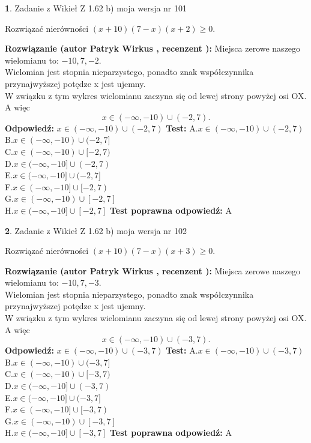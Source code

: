 \documentclass[12pt, a4paper]{article}
\theoremstyle{definition} %
\newtheorem{zad}{}
\newcommand{\zadStart}[1]{\begin{zad}#1\newline}
\newcommand{\zadStop}{\end{zad}}
\newcommand{\rozwStart}[2]{\noindent \textbf{Rozwiązanie (autor #1 , recenzent #2): }\newline}
\newcommand{\rozwStop}{\newline}
\newcommand{\odpStart}{\noindent \textbf{Odpowiedź:}\newline}
\newcommand{\odpStop}{\newline}
\newcommand{\testStart}{\noindent \textbf{Test:}\newline}
\newcommand{\testStop}{\newline}
\newcommand{\kluczStart}{\noindent \textbf{Test poprawna odpowiedź:}\newline}
\newcommand{\kluczStop}{\newline}
\begin{document}
\zadStart{Zadanie z Wikieł Z 1.62 b) moja wersja nr 101}

Rozwiązać nierówności $(x+10)(7-x)(x+2)\ge0$.
\zadStop
\rozwStart{Patryk Wirkus}{}
Miejsca zerowe naszego wielomianu to: $-10, 7, -2$.\\
Wielomian jest stopnia nieparzystego, ponadto znak współczynnika przy\linebreak najwyższej potędze x jest ujemny.\\ W związku z tym wykres wielomianu zaczyna się od lewej strony powyżej osi OX. A więc $$x \in (-\infty,-10) \cup (-2,7).$$
\rozwStop
\odpStart
$x \in (-\infty,-10) \cup (-2,7)$
\odpStop
\testStart
A.$x \in (-\infty,-10) \cup (-2,7)$\\
B.$x \in (-\infty,-10) \cup (-2,7]$\\
C.$x \in (-\infty,-10) \cup [-2,7)$\\
D.$x \in (-\infty,-10] \cup (-2,7)$\\
E.$x \in (-\infty,-10] \cup (-2,7]$\\
F.$x \in (-\infty,-10] \cup [-2,7)$\\
G.$x \in (-\infty,-10) \cup [-2,7]$\\
H.$x \in (-\infty,-10] \cup [-2,7]$
\testStop
\kluczStart
A
\kluczStop



\zadStart{Zadanie z Wikieł Z 1.62 b) moja wersja nr 102}

Rozwiązać nierówności $(x+10)(7-x)(x+3)\ge0$.
\zadStop
\rozwStart{Patryk Wirkus}{}
Miejsca zerowe naszego wielomianu to: $-10, 7, -3$.\\
Wielomian jest stopnia nieparzystego, ponadto znak współczynnika przy\linebreak najwyższej potędze x jest ujemny.\\ W związku z tym wykres wielomianu zaczyna się od lewej strony powyżej osi OX. A więc $$x \in (-\infty,-10) \cup (-3,7).$$
\rozwStop
\odpStart
$x \in (-\infty,-10) \cup (-3,7)$
\odpStop
\testStart
A.$x \in (-\infty,-10) \cup (-3,7)$\\
B.$x \in (-\infty,-10) \cup (-3,7]$\\
C.$x \in (-\infty,-10) \cup [-3,7)$\\
D.$x \in (-\infty,-10] \cup (-3,7)$\\
E.$x \in (-\infty,-10] \cup (-3,7]$\\
F.$x \in (-\infty,-10] \cup [-3,7)$\\
G.$x \in (-\infty,-10) \cup [-3,7]$\\
H.$x \in (-\infty,-10] \cup [-3,7]$
\testStop
\kluczStart
A
\kluczStop
\end{document}
